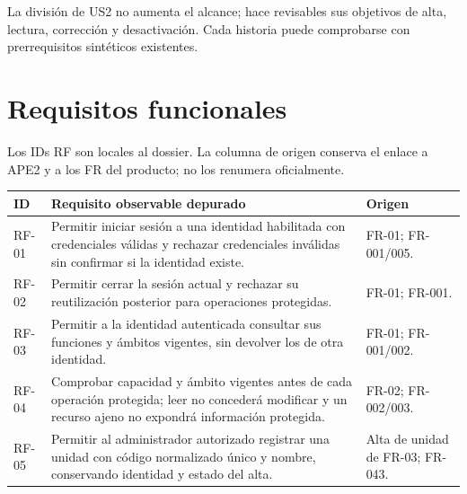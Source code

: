 \documentclass[12pt,a4paper]{report}
\begin{document}
La división de US2 no aumenta el alcance; hace revisables sus objetivos
de alta, lectura, corrección y desactivación. Cada historia puede
comprobarse con prerrequisitos sintéticos existentes.

\section{Requisitos funcionales}\label{dossier-requisitos-funcionales}

Los IDs RF son locales al dossier. La columna de origen conserva el
enlace a APE2 y a los FR del producto; no los renumera oficialmente.
{\def\LTcaptype{none} %
\begin{longtable}[]{@{}
  >{\raggedright\arraybackslash}p{}
  >{\raggedright\arraybackslash}p{}
  >{\raggedright\arraybackslash}p{}@{}}
\toprule\noalign{}
\begin{minipage}[b]{\linewidth}\raggedright
ID
\end{minipage} & \begin{minipage}[b]{\linewidth}\raggedright
Requisito observable depurado
\end{minipage} & \begin{minipage}[b]{\linewidth}\raggedright
Origen
\end{minipage} \\
\midrule\noalign{}
\endhead
\bottomrule\noalign{}
\endlastfoot
RF-01 & Permitir iniciar sesión a una identidad habilitada con
credenciales válidas y rechazar credenciales inválidas sin confirmar si
la identidad existe. & FR-01; FR-001/005. \\
RF-02 & Permitir cerrar la sesión actual y rechazar su reutilización
posterior para operaciones protegidas. & FR-01; FR-001. \\
RF-03 & Permitir a la identidad autenticada consultar sus funciones y
ámbitos vigentes, sin devolver los de otra identidad. & FR-01;
FR-001/002. \\
RF-04 & Comprobar capacidad y ámbito vigentes antes de cada operación
protegida; leer no concederá modificar y un recurso ajeno no expondrá
información protegida. & FR-02; FR-002/003. \\
RF-05 & Permitir al administrador autorizado registrar una unidad con
código normalizado único y nombre, conservando identidad y estado del
alta. & Alta de unidad de FR-03; FR-043. \\

\end{longtable}}
\end{document}
